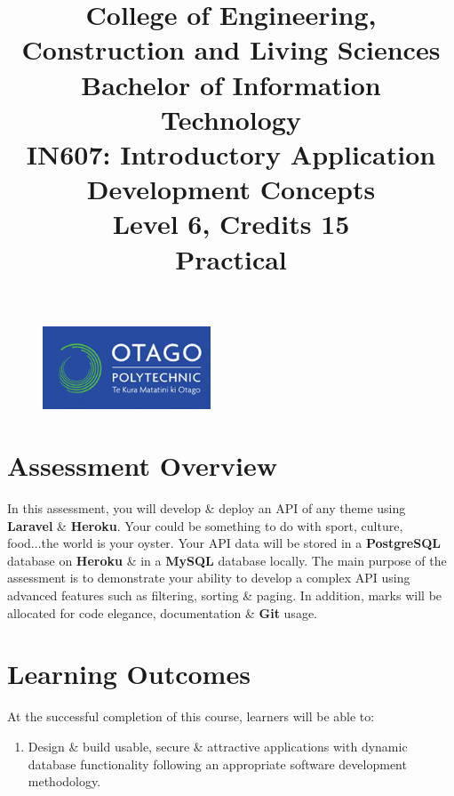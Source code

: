\documentclass{article}
\author{}
\begin{document}
\begin{figure}
	\centering
	\includegraphics[width=50mm]{./img/logo.png}
\end{figure}

\title{College of Engineering, Construction and Living Sciences\\Bachelor of Information Technology\\IN607: Introductory Application Development Concepts\\Level 6, Credits 15\\\textbf{Practical}}
\date{}
\maketitle

\section*{Assessment Overview}
In this assessment, you will develop \& deploy an API of any theme using \textbf{Laravel} \& \textbf{Heroku}. Your could be something to do with sport, culture, food...the world is your oyster. Your API data will be stored in a \textbf{PostgreSQL} database on \textbf{Heroku} \& in a \textbf{MySQL} database locally. The main purpose of the assessment is to demonstrate your ability to develop a complex API using advanced features such as filtering, sorting \& paging. In addition, marks will be allocated for code elegance, documentation \& \textbf{Git} usage. 

\section*{Learning Outcomes}
At the successful completion of this course, learners will be able to:
\begin{enumerate}
	\item Design \& build usable, secure \& attractive applications with dynamic database functionality following an appropriate software development methodology.
\end{enumerate}
\end{document}
